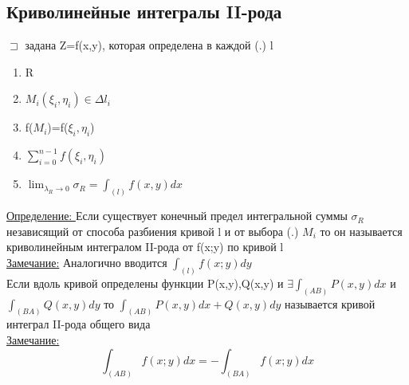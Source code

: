 \documentclass[12pt]{article}
\begin{document}
    \subsection{Криволинейные интегралы II-рода}
    $\sqsupset$ задана Z=f(x,y), которая определена в каждой (.) l
    \begin{enumerate}
      \item R
      \item $M_i(\xi_i,\eta_i) \in \Delta l_i$
      \item f($M_i$)=f($\xi_i,\eta_i$)
      \item $\sum_{i=0}^{n-1}f(\xi_i,\eta_i)$
      \item $\lim_{\lambda_R \to 0}\sigma_R=\int_{(l)}f(x,y)dx$
    \end{enumerate}
    \underline{Определение: }Если существует конечный предел интегральной суммы $\sigma_R$
    независящий от способа разбиения кривой l и от выбора (.) $M_i$ то он называется криволинейным
    интегралом II-рода от f(x;y) по кривой l\\
    \underline{Замечание:} Аналогично вводится $\int_{(l)}f(x;y)dy$\\
    Если вдоль кривой определены функции P(x,y),Q(x,y) и $\exists \int_{(AB)}P(x,y)dx$ и $\int_{(BA)}Q(x,y)dy$
    то $\int_{(AB)}P(x,y)dx+Q(x,y)dy$ называется кривой интеграл II-рода общего вида\\
    \underline{Замечание:}\[\int_{(AB)}f(x;y)dx=-\int_{(BA)}f(x;y)dx\]
\end{document}
